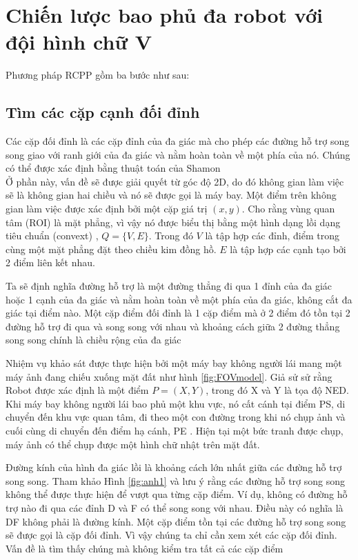 
\section{Chiến lược bao phủ đa robot với đội hình chữ V}
\label{sec:sea}
Phương pháp RCPP gồm ba bước như sau:\\

\subsection{Tìm các cặp cạnh đối đỉnh}
Các cặp đối đỉnh là các cặp đỉnh của đa giác mà cho phép các đường hỗ trợ song song giao với ranh giới của đa giác và nằm hoàn toàn về một phía của nó. Chúng có thể được xác định bằng thuật toán của Shamon \cite{shamos1978computational}\\

Ở phần này, vấn đề sẽ được giải quyết từ góc độ 2D, do đó không gian làm việc sẽ là không gian hai chiều và nó sẽ được gọi là máy bay. Một điểm trên không gian làm việc được xác định bởi một cặp giá trị $(x, y)$. Cho rằng vùng quan tâm (ROI) là mặt phẳng, vì vậy nó được biểu thị bằng một hình dạng lồi dạng tiêu chuẩn (convext) \cite{10.1007/11841036_57}, $Q = \{ V, E \}$. Trong đó $V$ là tập hợp các đỉnh, điểm trong cùng một mặt phẳng đặt theo chiều kim đồng hồ. $E$ là tập hợp các cạnh tạo bởi 2 điểm liên kết nhau.

Ta sẽ định nghĩa đường hỗ trợ là một đường thẳng đi qua 1 đỉnh của đa giác hoặc 1 cạnh của đa giác và nằm hoàn toàn về một phía của đa giác, không cắt đa giác tại điểm nào. Một cặp điểm đối đỉnh là 1 cặp điểm mà ở 2 điểm đó tồn tại 2 đường hỗ trợ đi qua và song song với nhau và khoảng cách giữa 2 đường thẳng song song chính là chiều rộng của đa giác

Nhiệm vụ khảo sát được thực hiện bởi một máy bay không người lái mang một máy ảnh đang chiếu xuống mặt đất như hình \ref{fig:FOVmodel}. Giả sử sử rằng Robot được xác định là một điểm $P = (X, Y)$, trong đó X và Y là tọa độ NED. Khi máy bay không người lái bao phủ một khu vực, nó cất cánh tại điểm PS, di chuyển đến khu vực quan tâm, đi theo một con đường trong khi nó chụp ảnh và cuối cùng di chuyển đến điểm hạ cánh, PE . Hiện tại một bức tranh được chụp, máy ảnh có thể chụp được một hình chữ nhật trên mặt đất.

Đường kính của hình đa giác lồi là khoảng cách lớn nhất giữa các đường hỗ trợ song song. Tham khảo Hình \ref{fig:anh1} và lưu ý rằng các đường hỗ trợ song song không thể được thực hiện để vượt qua từng cặp điểm. Ví dụ, không có đường hỗ trợ nào đi qua các đỉnh D và F có thể song song với nhau. Điều này có nghĩa là DF không phải là đường kính. Một cặp điểm tồn tại các đường hỗ trợ song song sẽ được gọi là cặp đối đỉnh. Vì vậy chúng ta chỉ cần xem xét các cặp đối đỉnh. Vấn đề là tìm thấy chúng mà không kiểm tra tất cả các cặp điểm

